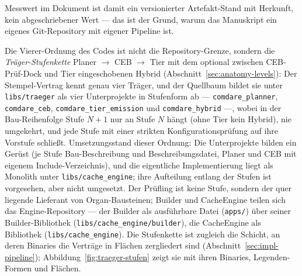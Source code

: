 \begin{nurlang}
\begin{itemize}
  Messwert im Dokument ist damit ein versionierter Artefakt-Stand mit Herkunft, kein abgeschriebener Wert
  --- das ist der Grund, warum das Manuskript ein eigenes Git-Repository mit eigener Pipeline ist.
\end{itemize}
Die Vierer-Ordnung des Codes ist nicht die Repository-Grenze, sondern die \emph{Träger-Stufenkette}
Planer $\to$ CEB $\to$ Tier mit dem optional zwischen CEB-Prüf-Dock und Tier eingeschobenen Hybrid
(Abschnitt~\ref{sec:anatomy-levels}): Der Stempel-Vertrag kennt genau vier Träger, und der Quellbaum
bildet sie unter \texttt{libs/traeger} als vier Unterprojekte in Stufenform ab --- \texttt{comdare\_planner},
\texttt{comdare\_ceb}, \texttt{comdare\_tier\_emission} und \texttt{comdare\_hybrid} ---, wobei in der
Bau-Reihenfolge Stufe $N+1$ nur an Stufe $N$ hängt (ohne Tier kein Hybrid), nie umgekehrt, und jede Stufe
mit einer strikten Konfigurationsprüfung auf ihre Vorstufe schließt.
Umsetzungsstand dieser Ordnung: Die Unterprojekte bilden ein Gerüst (je Stufe Bau-Beschreibung und
Beschreibungsdatei, Planer und CEB mit eigenem Include-Verzeichnis), und die eigentliche Implementierung liegt
als Monolith unter \texttt{libs/\allowbreak{}cache\_\allowbreak{}engine}; ihre Aufteilung entlang der Stufen
ist vorgesehen, aber nicht umgesetzt. Der Prüfling ist keine Stufe, sondern der quer liegende Lieferant von
Organ-Bausteinen; Builder und CacheEngine teilen sich das Engine-Repository --- der Builder als ausführbare
Datei (\texttt{apps/}) über seiner Builder-Bibliothek
(\texttt{libs/\allowbreak{}cache\_\allowbreak{}engine/\allowbreak{}builder}), die CacheEngine als Bibliothek
(\texttt{libs/\allowbreak{}cache\_\allowbreak{}engine}). Die Stufenkette ist zugleich die Schicht, an deren
Binaries die Verträge in Flächen zergliedert sind (Abschnitt~\ref{sec:impl-pipeline});
Abbildung~\ref{fig:traeger-stufen} zeigt sie mit ihren Binaries, Legenden-Formen und Flächen.
\begin{figure}[htbp]\centering
\end{figure}
\end{nurlang}
